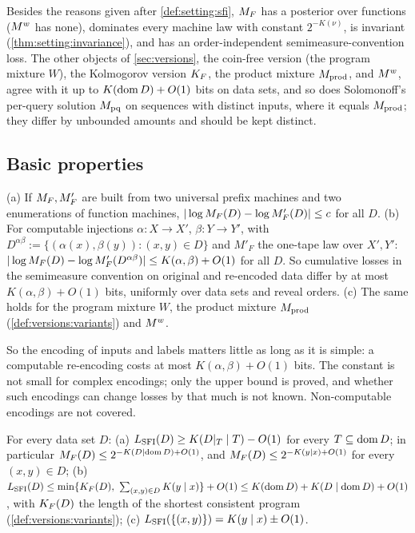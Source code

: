 \begin{remark}\label{rem:setting:recommend}
Besides the reasons given after \cref{def:setting:sfi}, $M_{F}$ has a posterior over functions ($M^{w}$ has none), dominates every machine law with constant $2^{-K(\nu)}$, is invariant (\cref{thm:setting:invariance}), and has an order-independent semimeasure-convention loss. The other objects of \cref{sec:versions}, the coin-free version (the program mixture $W$), the Kolmogorov version $K_{F}$, the product mixture $M_{\mathrm{prod}}$, and $M^{w}$, agree with it up to $K(\operatorname{dom} D)+O(1)$ bits on data sets, and so does Solomonoff's per-query solution $M_{\mathrm{pq}}$ on sequences with distinct inputs, where it equals $M_{\mathrm{prod}}$; they differ by unbounded amounts and should be kept distinct.
\end{remark}

\subsection{Basic properties}\label{sec:setting:basic}

\begin{theorem}[Invariance]\label{thm:setting:invariance}
(a) If $M_{F},M'_F$ are built from two universal prefix machines and two enumerations of function machines, $|\log M_{F}(D)-\log M'_F(D)|\le c$ for all $D$.
(b) For computable injections $\alpha:X\to X'$, $\beta:Y\to Y'$, with $D^{\alpha\beta}:=\{(\alpha(x),\beta(y)):(x,y)\in D\}$ and $M'_F$ the one-tape law over $X',Y'$: $|\log M_{F}(D)-\log M'_F(D^{\alpha\beta})|\le K(\alpha,\beta)+O(1)$ for all $D$. So cumulative losses in the semimeasure convention on original and re-encoded data differ by at most $K(\alpha,\beta)+O(1)$ bits, uniformly over data sets and reveal orders.
(c) The same holds for the program mixture $W$, the product mixture $M_{\mathrm{prod}}$ (\cref{def:versions:variants}) and $M^{w}$.
\end{theorem}

So the encoding of inputs and labels matters little as long as it is simple: a computable re-encoding costs at most $K(\alpha,\beta)+O(1)$ bits. The constant is not small for complex encodings; only the upper bound is proved, and whether such encodings can change losses by that much is not known. Non-computable encodings are not covered.

\begin{theorem}\label{thm:setting:coding}
For every data set $D$:
(a) $L_{\mathrm{SFI}}(D)\ge K(D|_T\mid T)-O(1)$ for every $T\subseteq\operatorname{dom} D$; in particular $M_{F}(D)\le2^{-K(D\mid\operatorname{dom} D)+O(1)}$, and $M_{F}(D)\le2^{-K(y\mid x)+O(1)}$ for every $(x,y)\in D$;
(b) $L_{\mathrm{SFI}}(D)\le\min\{K_{F}(D),\ \sum_{(x,y)\in D}K(y\mid x)\}+O(1)\le K(\operatorname{dom} D)+K(D\mid\operatorname{dom} D)+O(1)$, with $K_{F}(D)$ the length of the shortest consistent program (\cref{def:versions:variants});
(c) $L_{\mathrm{SFI}}(\{(x,y)\})=K(y\mid x)\pm O(1)$.
\end{theorem}

